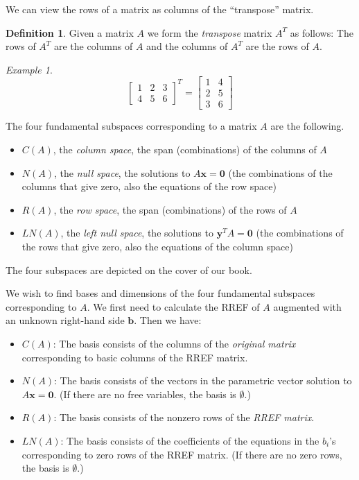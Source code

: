 \documentclass[11pt,oneside]{amsbook}
\theoremstyle{definition}
\theoremstyle{plain}
\theoremstyle{definition}
\newtheorem{definition}[theorem]{Definition}
\theoremstyle{remark}
\newtheorem{example}[theorem]{Example}
\numberwithin{equation}{section}
\numberwithin{figure}{section}
\begin{document}
We can view the rows of a matrix as columns of the ``transpose'' matrix.

\begin{definition}
  Given a matrix $A$ we form the \emph{transpose} matrix $A^T$ as follows: The rows of $A^T$ are the columns of $A$ and the columns of $A^T$ are the rows of $A$.
\end{definition}

\begin{example}
  \[\begin{bmatrix}1&2&3\\4&5&6\end{bmatrix}^T
    =\begin{bmatrix}1&4\\2&5\\3&6\end{bmatrix}
  \]
\end{example}

The four fundamental subspaces corresponding to a matrix $A$ are the following.
\begin{itemize}
  \item $C(A)$, the \emph{column space}, the span (combinations) of the columns of $A$
  \item $N(A)$, the \emph{null space}, the solutions to $A\mathbf{x}=\mathbf{0}$ (the combinations of the columns that give zero, also the equations of the row space)
  \item $R(A)$, the \emph{row space}, the span (combinations) of the rows of $A$
  \item $LN(A)$, the \emph{left null space}, the solutions to $\mathbf{y}^TA=\mathbf{0}$ (the combinations of the rows that give zero, also the equations of the column space)
\end{itemize}

The four subspaces are depicted on the cover of our book.

We wish to find bases and dimensions of the four fundamental subspaces corresponding to $A$. We first need to calculate the RREF of $A$ augmented with an unknown right-hand side $\mathbf{b}$. Then we have:

\begin{itemize}
  \item $C(A)$: The basis consists of the columns of the \emph{original matrix} corresponding to basic columns of the RREF matrix.
  \item $N(A)$: The basis consists of the vectors in the parametric vector solution to $A\mathbf{x}=\mathbf{0}$. (If there are no free variables, the basis is $\emptyset$.)
  \item $R(A)$: The basis consists of the nonzero rows of the \emph{RREF matrix}.
  \item $LN(A)$: The basis consists of the coefficients of the equations in the $b_i$'s corresponding to zero rows of the RREF matrix. (If there are no zero rows, the basis is $\emptyset$.)
\end{itemize}
\end{document}
